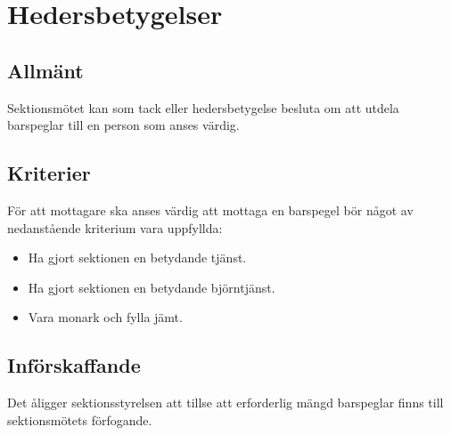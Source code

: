 \section{Hedersbetygelser}
\subsection{Allmänt}
Sektionsmötet kan som tack eller hedersbetygelse besluta om att utdela barspeglar till en person som anses värdig.
\subsection{Kriterier}
För att mottagare ska anses värdig att mottaga en barspegel bör något av nedanstående kriterium vara uppfyllda:
\begin{itemize}
\item Ha gjort sektionen en betydande tjänst.
\item Ha gjort sektionen en betydande björntjänst.
\item Vara monark och fylla jämt.
\end{itemize}
\subsection{Införskaffande}
Det åligger sektionsstyrelsen att tillse att erforderlig mängd barspeglar finns till sektionsmötets förfogande.

